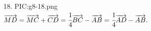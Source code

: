 18. {{PIC:g8-18.png}}\\
$\overrightarrow{MD}=\overrightarrow{MC}+\overrightarrow{CD}=\cfrac{1}{4}\overrightarrow{BC}-\overrightarrow{AB}=
\cfrac{1}{4}\overrightarrow{AD}-\overrightarrow{AB}.$\\
